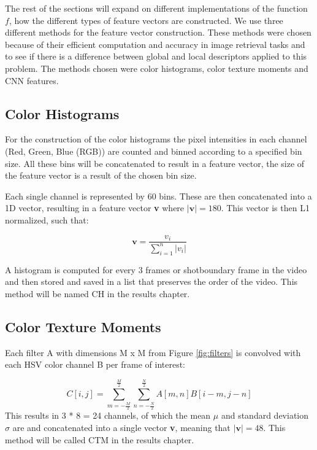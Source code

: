 \documentclass{report}
\begin{document}
The rest of the sections will expand on different implementations of the function $f$, how the different types of feature vectors are constructed. We use three different methods for the feature vector construction. These methods were chosen because of their efficient computation and accuracy in image retrieval tasks and to see if there is a difference between global and local descriptors applied to this problem. The methods chosen were color histograms, color texture moments and CNN features.

\subsection{Color Histograms}
For the construction of the color histograms the pixel intensities in each channel (Red, Green, Blue (RGB)) are counted and binned according to a specified bin size. All these bins will be concatenated to result in a feature vector, the size of the feature vector is a result of the chosen bin size.

Each single channel is represented by 60 bins. These are then concatenated into a 1D vector, resulting in a feature vector \textbf{v} where $|\textbf{v}| = 180$. This vector is then L1 normalized, such that:

\[\textbf{v} = \frac{v_i}{\sum_{i=1}^{n}|v_i|}\]

A histogram is computed for every 3 frames or shotboundary frame in the video and then stored and saved in a list that preserves the order of the video. This method will be named CH in the results chapter.

\subsection{Color Texture Moments}

Each filter A with dimensions M x M from Figure \ref{fig:filters} is convolved with each HSV color channel B per frame of interest:

\[ C[i,j] = \sum_{m=-\frac{M}{2}}^{\frac{M}{2}}\sum_{n=-\frac{N}{2}}^{\frac{N}{2}} A[m, n] B[i-m, j-n] \]
This results in 3 * 8 = 24 channels, of which the mean $\mu$ and standard deviation $\sigma$ are and concatenated into a single vector \textbf{v}, meaning that $|\textbf{v}| = 48$. This method will be called CTM in the results chapter. 
\end{document}
